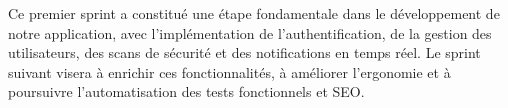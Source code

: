 \begin{justify}
Ce premier sprint a constitué une étape fondamentale dans le développement de notre application, avec l’implémentation de l’authentification, de la gestion des utilisateurs, des scans de sécurité et des notifications en temps réel. Le sprint suivant visera à enrichir ces fonctionnalités, à améliorer l’ergonomie et à poursuivre l’automatisation des tests fonctionnels et SEO.
\end{justify}
